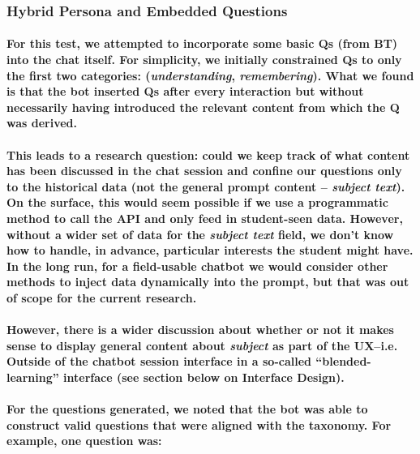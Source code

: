 \documentclass{article}
\begin{document}
\subsubsection*{Hybrid Persona and Embedded Questions}

\paragraph{For this test, we attempted to incorporate some basic Qs (from BT) into the chat itself. For simplicity, we initially constrained Qs to only the first two categories: (\textit{understanding}, \textit{remembering}). What we found is that the bot inserted Qs after every interaction but without necessarily having introduced the relevant content from which the Q was derived.}

\paragraph{This leads to a research question: could we keep track of what content has been discussed in the chat session and confine our questions only to the historical data (not the general prompt content – \textit{subject text}). On the surface, this would seem possible if we use a programmatic method to call the API and only feed in student-seen data. However, without a wider set of data for the \textit{subject text} field, we don’t know how to handle, in advance, particular interests the student might have. In the long run, for a field-usable chatbot we would consider other methods to inject data dynamically into the prompt, but that was out of scope for the current research.}

\paragraph{However, there is a wider discussion about whether or not it makes sense to display general content about \textit{subject} as part of the UX–i.e. Outside of the chatbot session interface in a so-called “blended-learning” interface (see section below on Interface Design).}

\paragraph{For the questions generated, we noted that the bot was able to construct valid questions that were aligned with the taxonomy. For example, one question was:\\}
\end{document}
